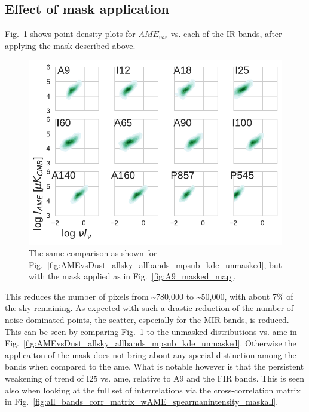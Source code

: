         \subsection{Effect of mask application}
            Fig.~\ref{fig:AMEvsDust_allsky_allbands_mpsub_kde_masked} shows point-density plots for $AME_{var}$ vs. each of the IR bands, after applying the mask described above.
               \begin{figure}
                 \includegraphics[width=\textwidth]{../Plots/ch_allsky/AMEvsDust_allsky_allbands_mpsub_kde_masked.pdf}
                 \centering
                 \caption{The same comparison as shown for Fig.~\ref{fig:AMEvsDust_allsky_allbands_mpsub_kde_unmasked}, but with the mask applied as in Fig.~\ref{fig:A9_masked_map}.}
                 \label{fig:AMEvsDust_allsky_allbands_mpsub_kde_masked}
               \end{figure}
            This reduces the number of pixels from \textasciitilde{}780,000 to \textasciitilde{}50,000, with about 7\% of the sky remaining. As expected with such a drastic reduction of the number of noise-dominated points, the scatter, especially for the MIR bands, is reduced. This can be seen by comparing Fig.~\ref{fig:AMEvsDust_allsky_allbands_mpsub_kde_masked} to the unmasked distributions vs. \acrshort{ame} in Fig.~\ref{fig:AMEvsDust_allsky_allbands_mpsub_kde_unmasked}. Otherwise the applicaiton of the mask does not bring about any special distinction among the bands when compared to the \acrshort{ame}. What is notable however is that the persistent weakening of trend of I25 vs. \acrshort{ame}, relative to A9 and the FIR bands. This is seen also when looking at the full set of interrelations via the cross-correlation matrix in Fig.~\ref{fig:all_bands_corr_matrix_wAME_spearmanintensity_maskall}.
